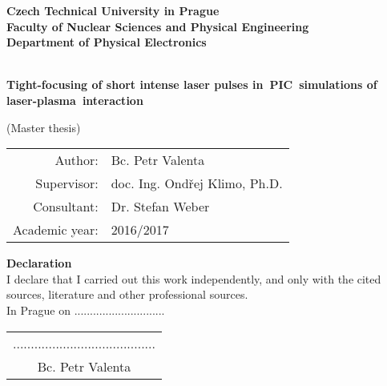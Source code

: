 \documentclass[12pt, twoside, a4paper, openright]{report}
\newcommand{\ctu}{Czech Technical University in Prague }
\newcommand{\fnspe}{Faculty of Nuclear Sciences and Physical Engineering }
\newcommand{\dpe}{Department of Physical Electronics }
\newcommand{\projecttitle}{Tight-focusing of short intense laser pulses in~PIC~simulations of laser-plasma~interaction }
\newcommand{\valenta}{Bc. Petr Valenta }
\newcommand{\klimo}{doc. Ing. Ondřej Klimo, Ph.D. }
\newcommand{\weber}{Dr. Stefan Weber }
\newcommand{\academicyear}{2016/2017 }
\begin{document}
\pagestyle{empty}


\mbox{}
\newpage

\begin{titlepage}

\begin{center}
{\Large \bf \ctu}\\[4mm]
{\Large \bf \fnspe}\\[4mm]
{\Large \bf \dpe}\\[16mm]
\epsfysize=45mm \\[12mm]
\begin{spacing}{2.0}
{\LARGE \bf \projecttitle}\\[2mm]
\end{spacing}
{\Large (Master thesis)} \\
\vfill
\end{center}

\begin{flushleft}
\begin{tabular}{rl}
Author: & \valenta \\[1mm]
Supervisor: & \klimo \\[1mm]
Consultant: & \weber \\[1mm]
Academic year: & \academicyear \\[1mm]
\end{tabular}
\end{flushleft}

\end{titlepage}


\newpage
\mbox{}


\newpage



\newpage



\newpage
\null
\vfill
{\bf \noindent Declaration} \\[5mm]
I declare that I carried out this work independently, and only with the cited sources, literature and other professional sources.\\
\vspace{5mm}In Prague on .............................\hfill
\begin{tabular}{c}
........................................\\
\valenta
\end{tabular}
\end{document}
